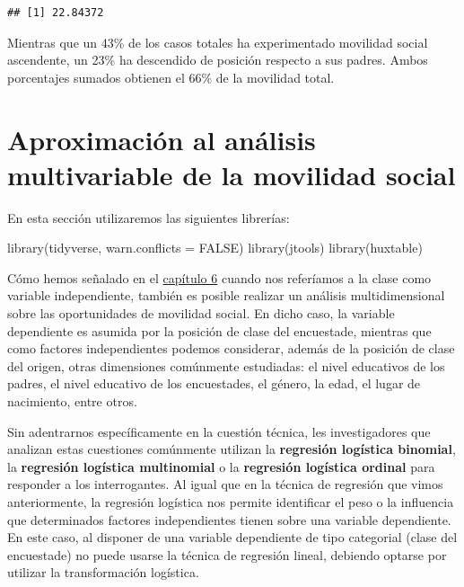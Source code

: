 \documentclass[
]{book}
\newenvironment{Shaded}{\begin{snugshade}}{\end{snugshade}}
\newcommand{\AttributeTok}[1]{\textcolor[rgb]{0.77,0.63,0.00}{#1}}
\newcommand{\ConstantTok}[1]{\textcolor[rgb]{0.00,0.00,0.00}{#1}}
\newcommand{\FunctionTok}[1]{\textcolor[rgb]{0.00,0.00,0.00}{#1}}
\newcommand{\NormalTok}[1]{#1}
\begin{document}
\begin{verbatim}
## [1] 22.84372
\end{verbatim}

Mientras que un 43\% de los casos totales ha experimentado movilidad social ascendente, un 23\% ha descendido de posición respecto a sus padres. Ambos porcentajes sumados obtienen el 66\% de la movilidad total.

\hypertarget{movilidad3}{%
\section{Aproximación al análisis multivariable de la movilidad social}\label{movilidad3}}

En esta sección utilizaremos las siguientes librerías:

\begin{Shaded}
\begin{Highlighting}[]
\FunctionTok{library}\NormalTok{(tidyverse, }\AttributeTok{warn.conflicts =} \ConstantTok{FALSE}\NormalTok{)}
\FunctionTok{library}\NormalTok{(jtools)}
\FunctionTok{library}\NormalTok{(huxtable)}
\end{Highlighting}
\end{Shaded}

Cómo hemos señalado en el \protect\hyperlink{aprox}{capítulo 6} cuando nos referíamos a la clase como variable independiente, también es posible realizar un análisis multidimensional sobre las oportunidades de movilidad social. En dicho caso, la variable dependiente es asumida por la posición de clase del encuestade, mientras que como factores independientes podemos considerar, además de la posición de clase del origen, otras dimensiones comúnmente estudiadas: el nivel educativos de los padres, el nivel educativo de los encuestades, el género, la edad, el lugar de nacimiento, entre otros.

Sin adentrarnos específicamente en la cuestión técnica, les investigadores que analizan estas cuestiones comúnmente utilizan la \textbf{regresión logística binomial}, la \textbf{regresión logística multinomial} o la \textbf{regresión logística ordinal} para responder a los interrogantes. Al igual que en la técnica de regresión que vimos anteriormente, la regresión logística nos permite identificar el peso o la influencia que determinados factores independientes tienen sobre una variable dependiente. En este caso, al disponer de una variable dependiente de tipo categorial (clase del encuestade) no puede usarse la técnica de regresión lineal, debiendo optarse por utilizar la transformación logística.
\end{document}
